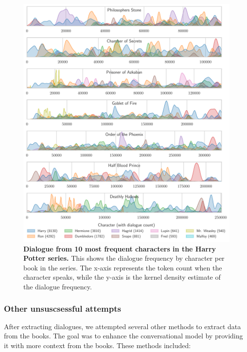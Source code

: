 \documentclass[fleqn,moreauthors,10pt]{ds_report}
\begin{document}
\begin{figure}[H]
	\centering
	\includegraphics[width=\linewidth]{hp_dialogue.pdf}
	\caption{\textbf{Dialogue from 10 most frequent characters in the Harry Potter series.} This shows the dialogue frequency by character per book in the series. The x-axis represents the token count when the character speaks, while the y-axis is the kernel density estimate of the dialogue frequency.}
	\label{fig:hp_dialogue}
\end{figure}


\subsubsection*{Other unsuscsessful attempts}

After extracting dialogues, we attempted several other methods to extract data from the books. The goal was to enhance the conversational model by providing it with more context from the books. These methods included:
\end{document}
